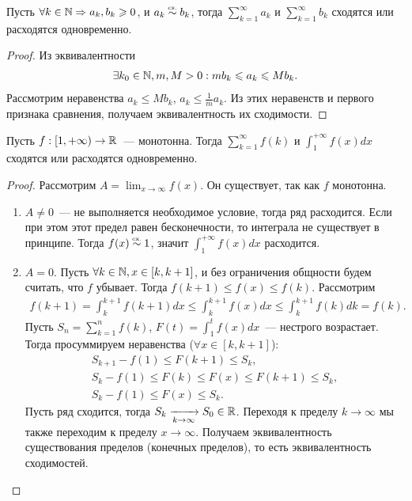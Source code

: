 \documentclass[../main.tex]{subfiles}
\begin{document}
\begin{proposition}
  Пусть $\forall k \in \mathbb{N} \Rightarrow a_k, b_k \geqslant 0$, и $a_k \eqincon b_k $, тогда $ \sum_{k=1}^{\infty} a_k $ и $ \sum_{k=1}^{\infty} b_k  $ сходятся или расходятся одновременно.  
  
\end{proposition}


\begin{proof}
  Из эквивалентности 
  \begin{gather} 
    \exists k_0 \in \mathbb{N}, m, M > 0: mb_k \leqslant a_k \leqslant Mb_k .
  \end{gather}
  Рассмотрим неравенства $a_k \leq M b_k$, $a_k \leq \frac{1}{m} a_k $. Из этих неравенств и первого признака сравнения, получаем эквивалентность их сходимости.
\end{proof}


\begin{proposition}
  Пусть $f:[1, + \infty) \to \mathbb{R}$~--- монотонна. Тогда $ \sum_{k=1}^{\infty} f(k) $ и $ \int_{1}^{ +\infty} f(x) dx$ сходятся или расходятся одновременно. 
\end{proposition}


\begin{proof}
  Рассмотрим $A = \lim_{x \to \infty } f(x)$. Он существует, так как $f$ монотонна. 
  \begin{enumerate}
    \item $A \neq 0$~--- не выполняется необходимое условие, тогда ряд расходится. Если при этом этот предел равен бесконечности, то интеграла не существует в принципе. Тогда $f(x) \eqincon 1$, значит $ \int_{1}^{+\infty} f(x) dx $ расходится.
    \item $A = 0$.  Пусть $\forall k\in\mathbb{N}, x \in [k, k+1]$, и без ограничения общности будем считать, что $f$ убывает. Тогда $f(k+1) \leq f(x)  \leq f(k)$. Рассмотрим 
    \begin{gather} 
      f(k+1) = \int_{k}^{k+1} f(k+1) dx \leq \int_{k}^{k+1} f(x) dx \leq \int_{k}^{k+1} f(k) dk = f(k).
    \end{gather} 
    Пусть $S_n = \sum_{k=1}^{n} f(k) $, $F(t) = \int_{1}^{t} f(x) dx$~--- нестрого возрастает. Тогда просуммируем неравенства ($\forall x \in [k, k+1]$): 
    \begin{gather} 
      S_{k+1} - f(1) \leq F(k+1) \leq S_k , \\
      S_{k} - f(1) \leq F(k) \leq F(x) \leq F(k+1) \leq S_k, \\
      S_k - f(1) \leq F(x) \leq S_k. 
    \end{gather} 
    Пусть ряд сходится, тогда $S_k  \xrightarrow[k \to  \infty ]{} S_0 \in \mathbb{R} $. Переходя к пределу $k \to \infty$ мы также переходим к пределу $x \to \infty$. Получаем эквивалентность существования пределов (конечных пределов), то есть эквивалентность сходимостей.   
    
  \end{enumerate}
\end{proof}
\end{document}
